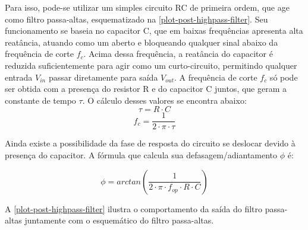 	Para isso, pode-se utilizar um simples circuito RC de primeira ordem, que age como filtro passa-altas, esquematizado na \autoref{plot-post-highpass-filter}. Seu funcionamento se baseia no capacitor C, que em baixas frequências apresenta alta reatância, atuando como um aberto e bloqueando qualquer sinal abaixo da frequência de corte $f_{c}$. Acima dessa frequência, a reatância do capacitor é reduzida suficientemente para agir como um curto-circuito, permitindo qualquer entrada $V_{in}$ passar diretamente para saída $V_{out}$. A frequência de corte $f_{c}$ só pode ser obtida com a presença do resistor R e do capacitor C juntos, que geram a constante de tempo $\tau$. O cálculo desses valores se encontra abaixo:
	\begin{equation}
	\tau = R \cdot C
	\end{equation}
	\begin{equation}
	f_{c} = \frac{1}{2 \cdot \pi \cdot \tau}
	\end{equation}
	
	Ainda existe a possibilidade da fase de resposta do circuito se deslocar devido à presença do capacitor. A fórmula que calcula sua defasagem/adiantamento $\phi$ é:
	
	\begin{equation}
	\phi = arctan{\left(\frac{1}{2 \cdot \pi \cdot f_{op} \cdot R \cdot C}\right)}
	\end{equation}
	
	A \autoref{plot-post-highpass-filter} ilustra o comportamento da saída do filtro passa-altas juntamente com o esquemático do filtro passa-altas.
	
